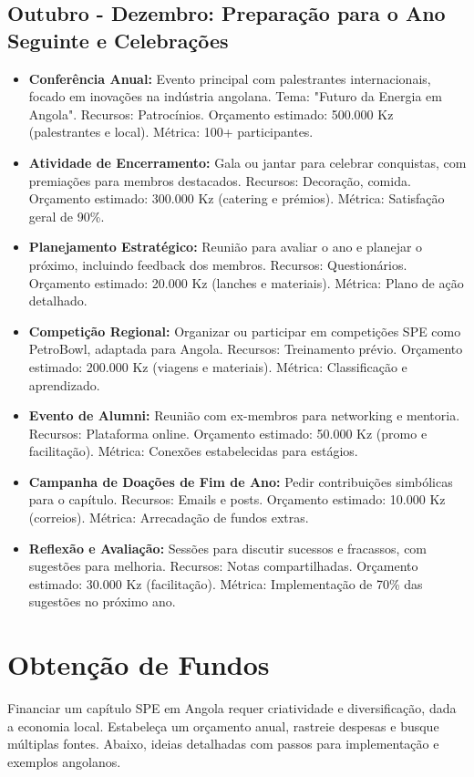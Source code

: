 \documentclass[12pt]{article}
\begin{document}
\subsection{Outubro - Dezembro: Preparação para o Ano Seguinte e Celebrações}
\begin{itemize}
    \item \textbf{Conferência Anual:} Evento principal com palestrantes internacionais, focado em inovações na indústria angolana. Tema: "Futuro da Energia em Angola". Recursos: Patrocínios. Orçamento estimado: 500.000 Kz (palestrantes e local). Métrica: 100+ participantes.
    \item \textbf{Atividade de Encerramento:} Gala ou jantar para celebrar conquistas, com premiações para membros destacados. Recursos: Decoração, comida. Orçamento estimado: 300.000 Kz (catering e prémios). Métrica: Satisfação geral de 90\%.
    \item \textbf{Planejamento Estratégico:} Reunião para avaliar o ano e planejar o próximo, incluindo feedback dos membros. Recursos: Questionários. Orçamento estimado: 20.000 Kz (lanches e materiais). Métrica: Plano de ação detalhado.
    \item \textbf{Competição Regional:} Organizar ou participar em competições SPE como PetroBowl, adaptada para Angola. Recursos: Treinamento prévio. Orçamento estimado: 200.000 Kz (viagens e materiais). Métrica: Classificação e aprendizado.
    \item \textbf{Evento de Alumni:} Reunião com ex-membros para networking e mentoria. Recursos: Plataforma online. Orçamento estimado: 50.000 Kz (promo e facilitação). Métrica: Conexões estabelecidas para estágios.
    \item \textbf{Campanha de Doações de Fim de Ano:} Pedir contribuições simbólicas para o capítulo. Recursos: Emails e posts. Orçamento estimado: 10.000 Kz (correios). Métrica: Arrecadação de fundos extras.
    \item \textbf{Reflexão e Avaliação:} Sessões para discutir sucessos e fracassos, com sugestões para melhoria. Recursos: Notas compartilhadas. Orçamento estimado: 30.000 Kz (facilitação). Métrica: Implementação de 70\% das sugestões no próximo ano.
\end{itemize}

\section{Obtenção de Fundos}

Financiar um capítulo SPE em Angola requer criatividade e diversificação, dada a economia local. Estabeleça um orçamento anual, rastreie despesas e busque múltiplas fontes. Abaixo, ideias detalhadas com passos para implementação e exemplos angolanos.
\end{document}
